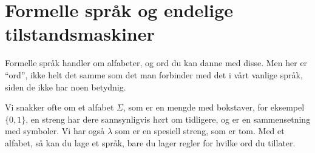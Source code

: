 \section{Formelle språk og endelige tilstandsmaskiner}

Formelle språk handler om alfabeter, og ord du kan danne med disse. Men her er \enquote{ord},
ikke helt det samme som det man forbinder med det i vårt vanlige språk, siden de ikke har noen betydnig.

Vi snakker ofte om et alfabet $\Sigma$, som er en mengde med bokstaver, for eksempel $\{0,1\}$, en streng
har dere sannsynligvis hørt om tidligere, og er en sammensetning med symboler. Vi har også $\lambda$ som er
en spesiell streng, som er tom. Med et alfabet, så kan du lage et språk, bare du lager regler for
hvilke ord du tillater.

